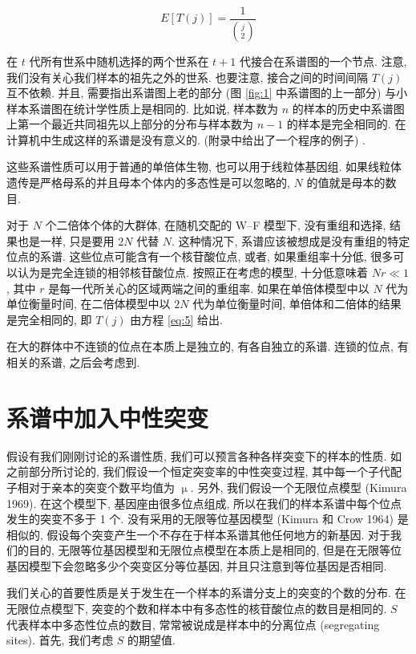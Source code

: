 \documentclass[
    12pt,%
    ]{article}
\begin{document}
\begin{equation} \label{eq:5}
    E[T(j)]=\frac{1}{\binom{j}{2}}
\end{equation}

在 $t$ 代所有世系中随机选择的两个世系在 $t+1$ 代接合在系谱图的一个节点. 注意, 我们没有关心我们样本的祖先之外的世系.
也要注意, 接合之间的时间间隔 $T(j)$ 互不依赖. 并且, 需要指出系谱图上老的部分 (图 \ref{fig:1} 中系谱图的上一部分)
与小样本系谱图在统计学性质上是相同的. 比如说, 样本数为 $n$
的样本的历史中系谱图上第一个最近共同祖先以上部分的分布与样本数为 $n-1$ 的样本是完全相同的.
在计算机中生成这样的系谱是没有意义的. (附录中给出了一个程序的例子) .

这些系谱性质可以用于普通的单倍体生物, 也可以用于线粒体基因组. 如果线粒体遗传是严格母系的并且母本个体内的多态性是可以忽略的,
$N$ 的值就是母本的数目.

对于 $N$ 个二倍体个体的大群体, 在随机交配的 W--F 模型下, 没有重组和选择, 结果也是一样, 只是要用 $2N$ 代替 $N$.
这种情况下, 系谱应该被想成是没有重组的特定位点的系谱. 这些位点可能含有一个核苷酸位点, 或者, 如果重组率十分低,
很多可以认为是完全连锁的相邻核苷酸位点. 按照正在考虑的模型, 十分低意味着 $Nr\ll 1$, 其中 $r$
是每一代所关心的区域两端之间的重组率. 如果在单倍体模型中以 $N$ 代为单位衡量时间, 在二倍体模型中以 $2N$ 代为单位衡量时间,
单倍体和二倍体的结果是完全相同的, 即 $T(j)$ 由方程 \ref{eq:5} 给出.

在大的群体中不连锁的位点在本质上是独立的, 有各自独立的系谱. 连锁的位点, 有相关的系谱, 之后会考虑到.

\section{系谱中加入中性突变}

假设有我们刚刚讨论的系谱性质, 我们可以预言各种各样突变下的样本的性质. 如之前部分所讨论的,
我们假设一个恒定突变率的中性突变过程, 其中每一个子代配子相对于亲本的突变个数平均值为 $\upmu$. 另外,
我们假设一个无限位点模型 (Kimura 1969). 在这个模型下, 基因座由很多位点组成,
所以在我们的样本系谱中每个位点发生的突变不多于 1 个. 没有采用的无限等位基因模型 (Kimura 和 Crow 1964) 是相似的,
假设每个突变产生一个不存在于样本系谱其他任何地方的新基因. 对于我们的目的, 无限等位基因模型和无限位点模型在本质上是相同的,
但是在无限等位基因模型下会忽略多少个突变区分等位基因, 并且只注意到等位基因是否相同.

我们关心的首要性质是关于发生在一个样本的系谱分支上的突变的个数的分布. 在无限位点模型下,
突变的个数和样本中有多态性的核苷酸位点的数目是相同的. $S$ 代表样本中多态性位点的数目, 常常被说成是样本中的分离位点
(segregating sites). 首先, 我们考虑 $S$ 的期望值.
\end{document}
